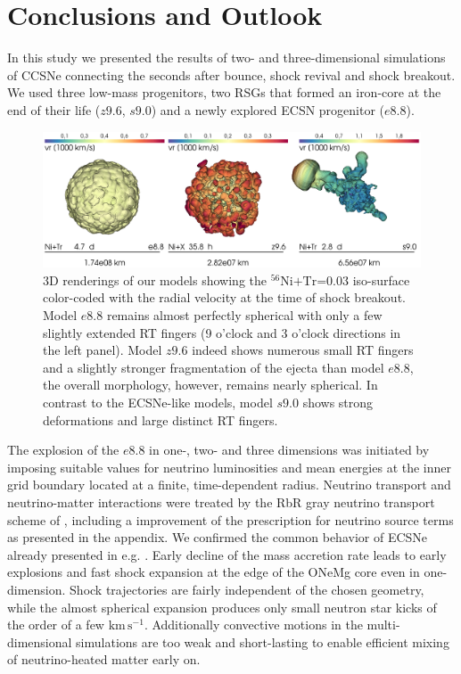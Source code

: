 \documentclass[fleqn,usenatbib]{mnras}
\newcommand{\nickel}{\ensuremath{\mathrm{^{56}Ni}}\xspace}
\newcommand{\tracer}{\ensuremath{\mathrm{Tr}}\xspace}
\newcommand{\kms}{\ensuremath{\mathrm{km\, s^{-1}}}}
\begin{document}
\section{Conclusions and Outlook}
In this study we presented the results of two- and three-dimensional
 simulations of CCSNe connecting the seconds after bounce, shock 
 revival and shock breakout. We used three low-mass progenitors, 
 two RSGs that formed an iron-core at the end of their life 
 ($z9.6$, $s9.0$) and a newly explored ECSN progenitor ($e8.8$). 

\begin{figure}%
 \centering
 \includegraphics[width=\textwidth,trim=0cm 0.0cm 0cm 0cm,clip]{pic/visit_models.png}
 \caption{3D renderings of our models showing the $\nickel\mathord{+}\tracer\mathord{=}0.03$ iso-surface color-coded with the radial velocity at the time of shock breakout. Model $e8.8$ remains almost perfectly spherical with only a few slightly extended RT fingers (9 o'clock and 3 o'clock directions in the left panel). Model $z9.6$ indeed shows numerous small RT fingers and a slightly stronger fragmentation of the ejecta than model $e8.8$, the overall morphology, however, remains nearly spherical. In contrast to the ECSNe-like models, model $s9.0$ shows strong deformations and large distinct RT fingers. 
 }
 \label{fig:all 3d models visit}
\end{figure}%

The explosion of the $e8.8$ in one-, two- and three dimensions 
was initiated by imposing suitable values for neutrino luminosities 
and mean energies at the inner grid boundary located at a finite, 
time-dependent radius. Neutrino transport and neutrino-matter interactions 
were treated by the RbR gray neutrino transport scheme of \citet{Scheck2006}, 
including a improvement of the prescription for neutrino source 
terms as presented in the appendix. We confirmed the common behavior of 
ECSNe already presented in e.g. \citet{Kitaura2006,Gessner2018}. 
Early decline of the mass accretion rate leads to early explosions and 
fast shock expansion at the edge of the ONeMg core even in one-dimension. 
Shock trajectories are fairly independent of the chosen geometry, 
while the almost spherical expansion produces only small neutron 
star kicks of the order of a few \kms. Additionally convective 
motions in the multi-dimensional simulations are too weak and 
short-lasting to enable efficient mixing of neutrino-heated matter early on.
\end{document}
